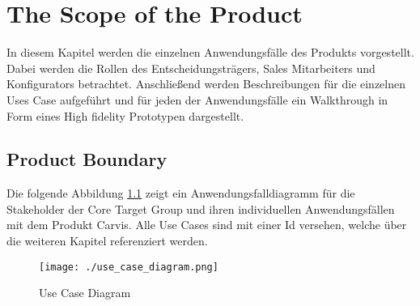 \chapter{The Scope of the Product}
In diesem Kapitel werden die einzelnen Anwendungsfälle des Produkts vorgestellt. Dabei werden die Rollen des Entscheidungsträgers, Sales Mitarbeiters und Konfigurators betrachtet. Anschließend werden Beschreibungen für die einzelnen Uses Case aufgeführt und für jeden der Anwendungsfälle ein Walkthrough in Form eines High fidelity Prototypen dargestellt.
\section{Product Boundary}
Die folgende Abbildung \ref{SopeOfProduct:ContextDiagram} zeigt ein Anwendungsfalldiagramm für die Stakeholder der Core Target Group und ihren individuellen Anwendungsfällen mit dem Produkt Carvis. Alle Use Cases sind mit einer Id versehen, welche über die weiteren Kapitel referenziert werden.
\begin{figure}[H]
  \centering
  \texttt{[image: ./use\_case\_diagram.png]}
  \caption{Use Case Diagram}
  \label{SopeOfProduct:ContextDiagram}
\end{figure}
